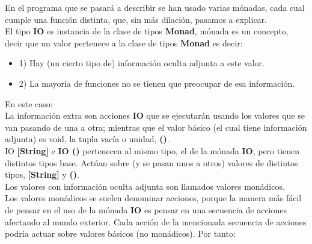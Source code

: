 En el programa que se pasar\'a a describir se han usado varias m\'onadas, cada cual cumple una funci\'on distinta, que, sin m\'as dilaci\'on, pasamos a explicar.\\

El tipo \textbf{IO} es instancia de la clase de tipos \textbf{Monad}, m\'onada es un concepto, decir que un valor pertenece a la clase de tipos \textbf{\textbf{Monad}} es decir:

\begin{itemize}
  \item 1) Hay (un cierto tipo de) informaci\'on oculta adjunta a este valor.
  \item 2) La mayor\'ia de funciones no se tienen que preocupar de esa informaci\'on.
\end{itemize}

En este caso:\\

La informaci\'on extra son acciones \textbf{IO} que se ejecutar\'an usando los valores que se van pasando de una a otra; mientras que el valor b\'asico (el cual tiene informaci\'on adjunta) es void, la tupla vac\'ia o unidad, \textbf{()}.\\

IO \textbf{[String]} e \textbf{IO ()} pertenecen al mismo tipo, el de la m\'onada \textbf{IO}, pero tienen distintos tipos base. Act\'uan sobre (y se pasan unos a otros) valores de distintos tipos, \textbf{[String]} y \textbf{()}.\\

Los valores con informaci\'on oculta adjunta son llamados valores mon\'adicos.\\

Los valores mon\'adicos se suelen denominar acciones, porque la manera m\'as f\'acil de pensar en el uso de la m\'onada \textbf{IO} es pensar en una secuencia de acciones afectando al mundo exterior. Cada acci\'on de la mencionada secuencia de acciones podr\'ia actuar sobre valores b\'asicos (no mon\'adicos). Por tanto:


